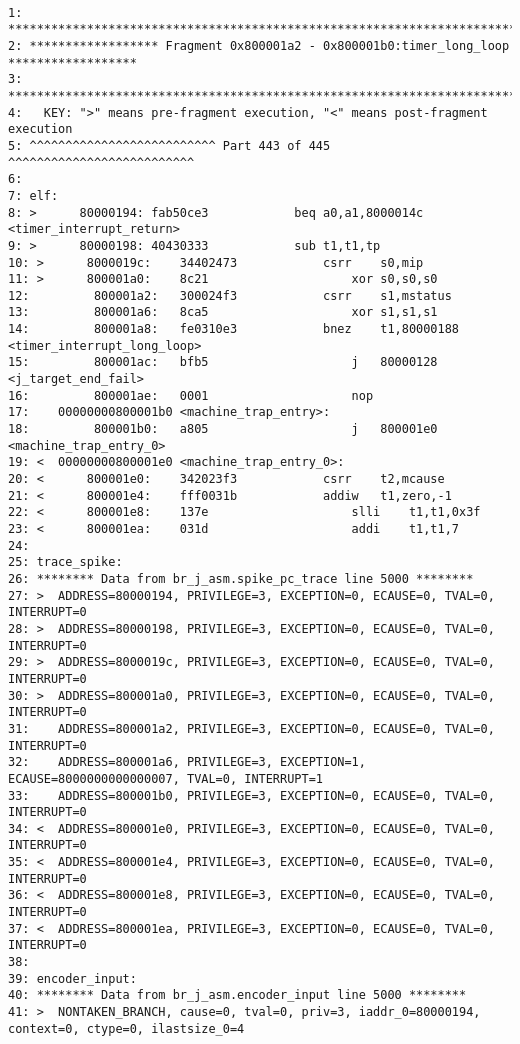 \begin{lstlisting}[basicstyle=\tiny]

1: **************************************************************************************
2: ****************** Fragment 0x800001a2 - 0x800001b0:timer_long_loop ******************
3: **************************************************************************************
4:   KEY: ">" means pre-fragment execution, "<" means post-fragment execution
5: ^^^^^^^^^^^^^^^^^^^^^^^^^^ Part 443 of 445 ^^^^^^^^^^^^^^^^^^^^^^^^^^
6:
7: elf:
8: >      80000194:	fab50ce3          	beq	a0,a1,8000014c <timer_interrupt_return>
9: >      80000198:	40430333          	sub	t1,t1,tp
10: >      8000019c:	34402473          	csrr	s0,mip
11: >      800001a0:	8c21                	xor	s0,s0,s0
12:         800001a2:	300024f3          	csrr	s1,mstatus
13:         800001a6:	8ca5                	xor	s1,s1,s1
14:         800001a8:	fe0310e3          	bnez	t1,80000188 <timer_interrupt_long_loop>
15:         800001ac:	bfb5                	j	80000128 <j_target_end_fail>
16:         800001ae:	0001                	nop
17:    00000000800001b0 <machine_trap_entry>:
18:         800001b0:	a805                	j	800001e0 <machine_trap_entry_0>
19: <  00000000800001e0 <machine_trap_entry_0>:
20: <      800001e0:	342023f3          	csrr	t2,mcause
21: <      800001e4:	fff0031b          	addiw	t1,zero,-1
22: <      800001e8:	137e                	slli	t1,t1,0x3f
23: <      800001ea:	031d                	addi	t1,t1,7
24:
25: trace_spike:
26: ******** Data from br_j_asm.spike_pc_trace line 5000 ********
27: >  ADDRESS=80000194, PRIVILEGE=3, EXCEPTION=0, ECAUSE=0, TVAL=0, INTERRUPT=0
28: >  ADDRESS=80000198, PRIVILEGE=3, EXCEPTION=0, ECAUSE=0, TVAL=0, INTERRUPT=0
29: >  ADDRESS=8000019c, PRIVILEGE=3, EXCEPTION=0, ECAUSE=0, TVAL=0, INTERRUPT=0
30: >  ADDRESS=800001a0, PRIVILEGE=3, EXCEPTION=0, ECAUSE=0, TVAL=0, INTERRUPT=0
31:    ADDRESS=800001a2, PRIVILEGE=3, EXCEPTION=0, ECAUSE=0, TVAL=0, INTERRUPT=0
32:    ADDRESS=800001a6, PRIVILEGE=3, EXCEPTION=1, ECAUSE=8000000000000007, TVAL=0, INTERRUPT=1
33:    ADDRESS=800001b0, PRIVILEGE=3, EXCEPTION=0, ECAUSE=0, TVAL=0, INTERRUPT=0
34: <  ADDRESS=800001e0, PRIVILEGE=3, EXCEPTION=0, ECAUSE=0, TVAL=0, INTERRUPT=0
35: <  ADDRESS=800001e4, PRIVILEGE=3, EXCEPTION=0, ECAUSE=0, TVAL=0, INTERRUPT=0
36: <  ADDRESS=800001e8, PRIVILEGE=3, EXCEPTION=0, ECAUSE=0, TVAL=0, INTERRUPT=0
37: <  ADDRESS=800001ea, PRIVILEGE=3, EXCEPTION=0, ECAUSE=0, TVAL=0, INTERRUPT=0
38:
39: encoder_input:
40: ******** Data from br_j_asm.encoder_input line 5000 ********
41: >  NONTAKEN_BRANCH, cause=0, tval=0, priv=3, iaddr_0=80000194, context=0, ctype=0, ilastsize_0=4

\end{lstlisting}
